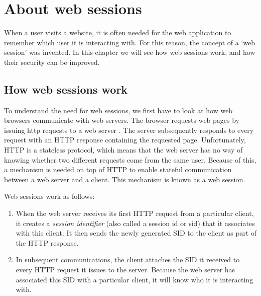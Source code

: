 \chapter{About web sessions}

When a user visits a website, it is often needed for the web application to remember which user it is interacting with. For this reason, the concept of a `web session' was invented. In this chapter we will see how web sessions work, and how their security can be improved.

\section{How web sessions work}\label{session-management}

To understand the need for web sessions, we first have to look at how web browsers communicate with web servers. The browser requests web pages by issuing \gls{http} requests to a web server \cite{Kurose2008}. The server subsequently responds to every request with an HTTP response containing the requested page. Unfortunately, HTTP is a stateless protocol, which means that the web server has no way of knowing whether two different requests come from the same user. Because of this, a mechanism is needed on top of HTTP to enable stateful communication between a web server and a client. This mechanism is known as a web session.

Web sessions work as follows:
\begin{enumerate}
	\item When the web server receives its first HTTP request from a particular client, it creates a \emph{session identifier} (also called a \gls{session id} or \gls{sid}) that it associates with this client. It then sends the newly generated SID to the client as part of the HTTP response.
	\item In subsequent communications, the client attaches the SID it received to every HTTP request it issues to the server. Because the web server has associated this SID with a particular client, it will know who it is interacting with.
\end{enumerate}

